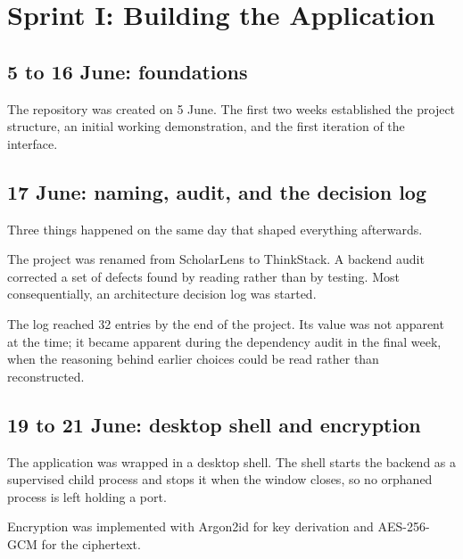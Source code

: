 \documentclass[11pt,a4paper]{article}
\begin{document}
\section{Sprint I: Building the Application}

\subsection{5 to 16 June: foundations}

The repository was created on 5 June. The first two weeks established the
project structure, an initial working demonstration, and the first iteration of
the interface.

\subsection{17 June: naming, audit, and the decision log}

Three things happened on the same day that shaped everything afterwards.

The project was renamed from ScholarLens to ThinkStack. A backend audit
corrected a set of defects found by reading rather than by testing. Most
consequentially, an architecture decision log was started.


The log reached 32 entries by the end of the project. Its value was not
apparent at the time; it became apparent during the dependency audit in the
final week, when the reasoning behind earlier choices could be read rather than
reconstructed.

\subsection{19 to 21 June: desktop shell and encryption}

The application was wrapped in a desktop shell. The shell starts the backend as
a supervised child process and stops it when the window closes, so no orphaned
process is left holding a port.

Encryption was implemented with Argon2id for key derivation and AES-256-GCM for
the ciphertext.
\end{document}
